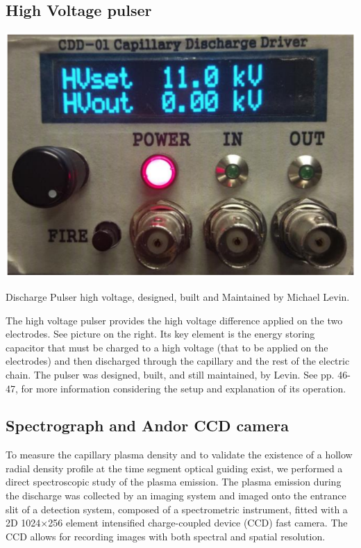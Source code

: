 \documentclass[justified,nofonts,nobib,openany]{tufte-book}
\begin{document}
\subsection{High Voltage pulser}
\begin{marginfigure}
        \includegraphics[width=\marginparwidth]{figures/hvpulser.PNG}
        \caption{Discharge Pulser high voltage, designed, built and Maintained by Michael Levin.}
\end{marginfigure}
The high voltage pulser provides the high voltage difference applied on the two electrodes. See picture on the right. Its key element is the energy storing capacitor that must be charged to a high voltage (that to be applied on the electrodes) and then discharged through the capillary and the rest of the electric chain. The pulser was designed, built, and still maintained, by Levin. See  \cite{Levin2009ExcitationAcceleration} pp. 46-47, for more information considering the setup and explanation of its operation.
	
\subsection{Spectrograph and Andor CCD camera}\label{ssec:spectro}
To measure the capillary plasma density and to validate the existence of a hollow radial density profile at the time segment optical guiding exist, we performed a direct spectroscopic study of the plasma emission. The plasma emission during the discharge was collected by an imaging system and imaged onto the entrance slit of a detection system, composed of a spectrometric instrument, fitted with a 2D 1024$\times$256 element intensified charge-coupled device (CCD) fast camera. The CCD allows for recording images with both spectral and spatial resolution.
\end{document}
